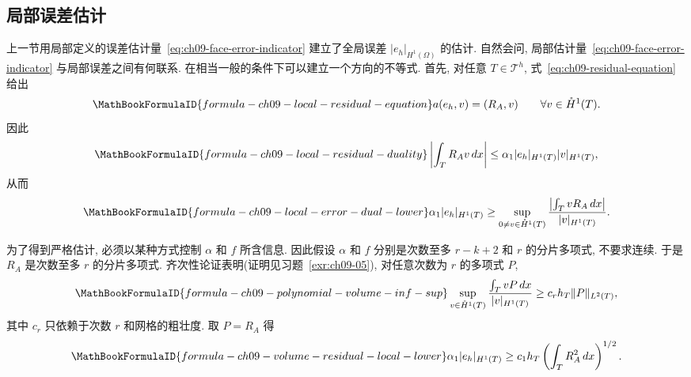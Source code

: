 \subsection{局部误差估计}
\label{sec:ch09-local-error-estimates}
\setcounter{thmcount}{0}
\setcounter{equation}{0}

上一节用局部定义的误差估计量~\eqref{eq:ch09-face-error-indicator} 建立了全局误差 $|e_h|_{H^1(\Omega)}$ 的估计. 自然会问, 局部估计量~\eqref{eq:ch09-face-error-indicator} 与局部误差之间有何联系. 在相当一般的条件下可以建立一个方向的不等式. 首先, 对任意 $T\in\mathcal T^h$, 式~\eqref{eq:ch09-residual-equation} 给出
\begin{equation}
\MathBookFormulaID{formula-ch09-local-residual-equation}
\label{eq:ch09-local-residual-equation}
a(e_h,v)=(R_A,v)
\qquad\forall v\in\mathring H^1(T).
\end{equation}
因此
\[
\MathBookFormulaID{formula-ch09-local-residual-duality}
\left|\int_TR_Av\,dx\right|
\leq\alpha_1|e_h|_{H^1(T)}|v|_{H^1(T)},
\]
从而
\[
\MathBookFormulaID{formula-ch09-local-error-dual-lower}
\alpha_1|e_h|_{H^1(T)}
\geq\sup_{0\neq v\in\mathring H^1(T)}
\frac{\left|\int_TvR_A\,dx\right|}{|v|_{H^1(T)}}.
\]

为了得到严格估计, 必须以某种方式控制 $\alpha$ 和 $f$ 所含信息. 因此假设 $\alpha$ 和 $f$ 分别是次数至多 $r-k+2$ 和 $r$ 的分片多项式, 不要求连续. 于是 $R_A$ 是次数至多 $r$ 的分片多项式. 齐次性论证表明(证明见习题~\ref{exr:ch09-05}), 对任意次数为 $r$ 的多项式 $P$,
\begin{equation}
\MathBookFormulaID{formula-ch09-polynomial-volume-inf-sup}
\label{eq:ch09-polynomial-volume-inf-sup}
\sup_{v\in\mathring H^1(T)}
\frac{\int_TvP\,dx}{|v|_{H^1(T)}}
\geq c_rh_T\|P\|_{L^2(T)},
\end{equation}
其中 $c_r$ 只依赖于次数 $r$ 和网格的粗壮度. 取 $P=R_A$ 得
\begin{equation}
\MathBookFormulaID{formula-ch09-volume-residual-local-lower}
\label{eq:ch09-volume-residual-local-lower}
\alpha_1|e_h|_{H^1(T)}
\geq c_1h_T\left(\int_TR_A^2\,dx\right)^{1/2}.
\end{equation}

